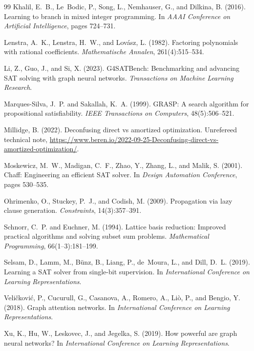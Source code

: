 \documentclass[11pt]{article}
\begin{document}
\begin{thebibliography}{99}
Khalil, E.~B., Le~Bodic, P., Song, L., Nemhauser, G., and Dilkina, B. (2016).
Learning to branch in mixed integer programming.
In \emph{AAAI Conference on Artificial Intelligence}, pages 724--731.

Lenstra, A.~K., Lenstra, H.~W., and Lov\'asz, L. (1982).
Factoring polynomials with rational coefficients.
\emph{Mathematische Annalen}, 261(4):515--534.

Li, Z., Guo, J., and Si, X. (2023).
G4SATBench: Benchmarking and advancing SAT solving with graph neural networks.
\emph{Transactions on Machine Learning Research}.

Marques-Silva, J.~P. and Sakallah, K.~A. (1999).
GRASP: A search algorithm for propositional satisfiability.
\emph{IEEE Transactions on Computers}, 48(5):506--521.

Millidge, B. (2022).
Deconfusing direct vs amortized optimization.
Unrefereed technical note, \url{https://www.beren.io/2022-09-25-Deconfusing-direct-vs-amortized-optimization/}.

Moskewicz, M.~W., Madigan, C.~F., Zhao, Y., Zhang, L., and Malik, S. (2001).
Chaff: Engineering an efficient SAT solver.
In \emph{Design Automation Conference}, pages 530--535.

Ohrimenko, O., Stuckey, P.~J., and Codish, M. (2009).
Propagation via lazy clause generation.
\emph{Constraints}, 14(3):357--391.

Schnorr, C.~P. and Euchner, M. (1994).
Lattice basis reduction: Improved practical algorithms and solving subset sum problems.
\emph{Mathematical Programming}, 66(1--3):181--199.

Selsam, D., Lamm, M., B\"unz, B., Liang, P., de~Moura, L., and Dill, D.~L. (2019).
Learning a SAT solver from single-bit supervision.
In \emph{International Conference on Learning Representations}.

Veli\v{c}kovi\'c, P., Cucurull, G., Casanova, A., Romero, A., Li\`o, P., and Bengio, Y. (2018).
Graph attention networks.
In \emph{International Conference on Learning Representations}.

Xu, K., Hu, W., Leskovec, J., and Jegelka, S. (2019).
How powerful are graph neural networks?
In \emph{International Conference on Learning Representations}.

\end{thebibliography}
\end{document}
